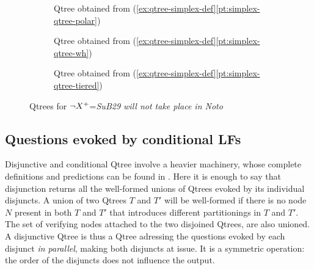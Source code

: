 \begin{figure}[H]
	\centering
	\begin{subfigure}[b]{.18\linewidth}
		\centering
		\caption{Qtree obtained from (\ref{ex:qtree-simplex-def}\ref{pt:simplex-qtree-polar})}\label{fig:qtree-not-noto-polar}
	\end{subfigure}\hfill
	\begin{subfigure}[b]{.35\linewidth}
		\centering
		\caption{Qtree obtained from (\ref{ex:qtree-simplex-def}\ref{pt:simplex-qtree-wh})}
		\label{fig:qtree-not-noto-wh}
	\end{subfigure}\hfill
	\begin{subfigure}[b]{.35\linewidth}
		\centering
		\caption{Qtree obtained from (\ref{ex:qtree-simplex-def}\ref{pt:simplex-qtree-tiered})}\label{fig:qtree-not-noto-tiered}
	\end{subfigure}
	\caption{Qtrees for $\neg X\protect^+$=\textit{SuB29 will not take place in Noto}}
	\label{fig:qtrees-not-noto}
\end{figure}


\subsection{Questions evoked by conditional LFs}

Disjunctive and conditional Qtree involve a heavier machinery, whose complete definitions and predictions can be found in \citet{HenotMortier2024}. Here it is enough to say that disjunction returns all the well-formed unions of Qtrees evoked by its individual disjuncts. A union of two Qtrees $T$ and $T'$ will be well-formed if there is no node $N$ present in both $T$ and $T'$ that introduces different partitionings in $T$ and $T'$. The set of verifying nodes attached to the two disjoined Qtrees, are also unioned. A disjunctive Qtree is thus a Qtree adressing the questions evoked by each disjunct \textit{in parallel}, making both disjuncts at issue. It is a symmetric operation: the order of the disjuncts does not influence the output. 

